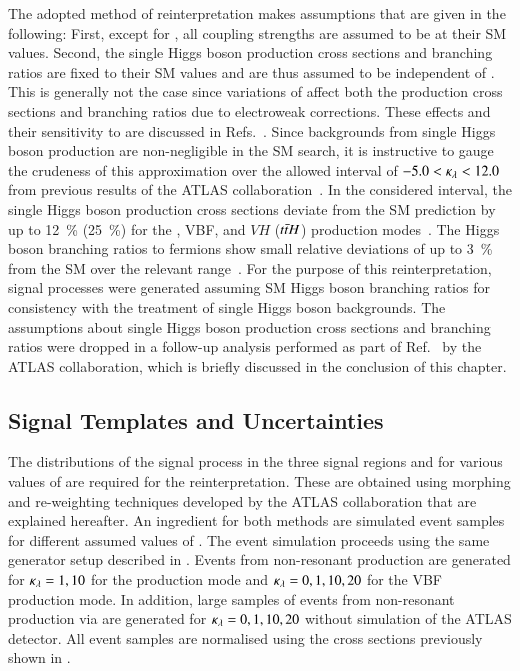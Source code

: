 The adopted method of reinterpretation makes assumptions that are
given in the following: First, except for \klambda, all coupling
strengths are assumed to be at their SM values. Second, the single
Higgs boson production cross sections and branching ratios are fixed
to their SM values and are thus assumed to be independent of
\klambda. This is generally not the case since variations of \klambda
affect both the production cross sections and branching ratios due to
electroweak corrections. These effects and their sensitivity to
\klambda are discussed in
Refs.~\cite{ATL-PHYS-PUB-2019-009,Degrassi:2016wml,Maltoni:2017ims}.
Since backgrounds from single Higgs boson production are
non-negligible in the SM \HH search, it is instructive to gauge the
crudeness of this approximation over the allowed interval of
$-5.0 < \kappa_{\lambda} < 12.0$ from previous results of the ATLAS
collaboration~\cite{HDBS-2018-58}. In the considered \klambda
interval, the single Higgs boson production cross sections deviate
from the SM prediction by up to \SI{12}{\percent} (\SI{25}{\percent})
for the \ggF, VBF, and $VH$ ($t\bar{t} H$) production
modes~\cite{ATL-PHYS-PUB-2019-009}. The Higgs boson branching ratios
to fermions show small relative deviations of up to \SI{3}{\percent}
from the SM over the relevant \klambda
range~\cite{ATL-PHYS-PUB-2019-009}. For the purpose of this
reinterpretation, signal processes were generated assuming SM Higgs
boson branching ratios for consistency with the treatment of single
Higgs boson backgrounds. The assumptions about single Higgs boson
production cross sections and branching ratios were dropped in a
follow-up analysis performed as part of
Ref.~\cite{ATL-HDBS-2022-03-002} by the ATLAS collaboration, which is
briefly discussed in the conclusion of this chapter.


\subsection{Signal Templates and Uncertainties}%
\label{sec:self_coupling_signals}

The distributions of the signal process in the three signal regions
and for various values of \klambda are required for the
reinterpretation.
These are obtained using morphing and re-weighting techniques
developed by the ATLAS collaboration that are explained hereafter. An
ingredient for both methods are simulated event samples for different
assumed values of \klambda. The event simulation proceeds using the
same generator setup described in
. Events from non-resonant \HH
production are generated for $\kappa_{\lambda} = 1, 10$ for the \ggF
production mode and $\kappa_{\lambda} = 0, 1, 10, 20$ for the VBF production
mode. In addition, large samples of events from non-resonant \HH
production via \ggF are generated for $\kappa_{\lambda} = 0, 1, 10, 20$
without simulation of the ATLAS detector. All event samples are
normalised using the cross sections previously shown in
.


